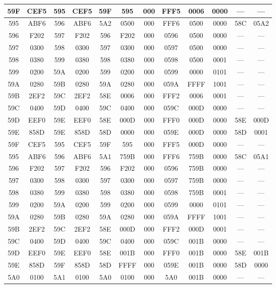 \begin{center}
\begin{tabular}{|c|c|c|c|c|c|c|c|c|c|c|c|}
\hline
59F & CEF5 & 595 & CEF5 & 59F & 595 & 000 & FFF5 & 0006 & 0000 & --- & ---\\
\hline
\hline
595 & ABF6 & 596 & ABF6 & 5A2 & 0500 & 000 & FFF6 & 0500 & 0000 & 58C & 05A2\\
\hline
596 & F202 & 597 & F202 & 596 & F202 & 000 & 0596 & 0500 & 0000 & --- & ---\\
\hline
597 & 0300 & 598 & 0300 & 597 & 0300 & 000 & 0597 & 0500 & 0000 & --- & ---\\
\hline
598 & 0380 & 599 & 0380 & 598 & 0380 & 000 & 0598 & 0500 & 0001 & --- & ---\\
\hline
599 & 0200 & 59A & 0200 & 599 & 0200 & 000 & 0599 & 0000 & 0101 & --- & ---\\
\hline
59A & 0280 & 59B & 0280 & 59A & 0280 & 000 & 059A & FFFF & 1001 & --- & ---\\
\hline
59B & 2EF2 & 59C & 2EF2 & 58E & 0006 & 000 & FFF2 & 0006 & 0001 & --- & ---\\
\hline
59C & 0400 & 59D & 0400 & 59C & 0400 & 000 & 059C & 000D & 0000 & --- & ---\\
\hline
59D & EEF0 & 59E & EEF0 & 58E & 000D & 000 & FFF0 & 000D & 0000 & 58E & 000D\\
\hline
59E & 858D & 59E & 858D & 58D & 0000 & 000 & 059E & 000D & 0000 & 58D & 0001\\
\hline
59F & CEF5 & 595 & CEF5 & 59F & 595 & 000 & FFF5 & 000D & 0000 & --- & ---\\
\hline
\hline
595 & ABF6 & 596 & ABF6 & 5A1 & 759B & 000 & FFF6 & 759B & 0000 & 58C & 05A1\\
\hline
596 & F202 & 597 & F202 & 596 & F202 & 000 & 0596 & 759B & 0000 & --- & ---\\
\hline
597 & 0300 & 598 & 0300 & 597 & 0300 & 000 & 0597 & 759B & 0000 & --- & ---\\
\hline
598 & 0380 & 599 & 0380 & 598 & 0380 & 000 & 0598 & 759B & 0001 & --- & ---\\
\hline
599 & 0200 & 59A & 0200 & 599 & 0200 & 000 & 0599 & 0000 & 0101 & --- & ---\\
\hline
59A & 0280 & 59B & 0280 & 59A & 0280 & 000 & 059A & FFFF & 1001 & --- & ---\\
\hline
59B & 2EF2 & 59C & 2EF2 & 58E & 000D & 000 & FFF2 & 000D & 0001 & --- & ---\\
\hline
59C & 0400 & 59D & 0400 & 59C & 0400 & 000 & 059C & 001B & 0000 & --- & ---\\
\hline
59D & EEF0 & 59E & EEF0 & 58E & 001B & 000 & FFF0 & 001B & 0000 & 58E & 001B\\
\hline
59E & 858D & 59F & 858D & 58D & FFFF & 000 & 059E & 001B & 0000 & 58D & 0000\\
\hline
5A0 & 0100 & 5A1 & 0100 & 5A0 & 0100 & 000 & 5A0 & 001B & 0000 & --- & ---\\
\hline

\hline
\end{tabular}
\end{center}

